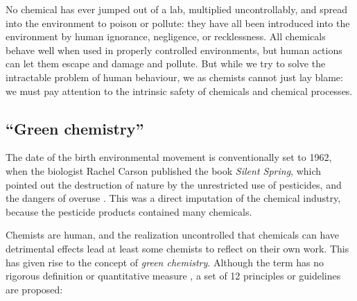 No chemical has ever jumped out of a lab, multiplied uncontrollably, and spread
into the environment to poison or pollute: they have all been introduced into
the environment by human ignorance, negligence, or recklessness. All chemicals
behave well when used in properly controlled environments, but human actions can
let them escape and damage and pollute. But while we try to solve the
intractable problem of human behaviour, we as chemists cannot just lay blame: we
must pay attention to the intrinsic safety of chemicals and chemical processes.
 
\subsection{``Green chemistry''}
\label{sec:GreenChemistry}
The date of the birth environmental movement is conventionally set to 1962, when
the biologist Rachel Carson published the book \textit{Silent Spring}, which
pointed out the destruction of nature by the unrestricted use of pesticides, and
the dangers of overuse \autocite{Carson1962}. This was a direct imputation of
the chemical industry, because the pesticide products contained many chemicals.

Chemists are human, and the realization uncontrolled that chemicals can have
detrimental effects lead at least some chemists to reflect on their own work.
This has given rise to the concept of \textit{green chemistry}. Although the
term has no rigorous definition or quantitative measure \autocite{Linthorst2010},
a set of 12 principles or guidelines are proposed:

